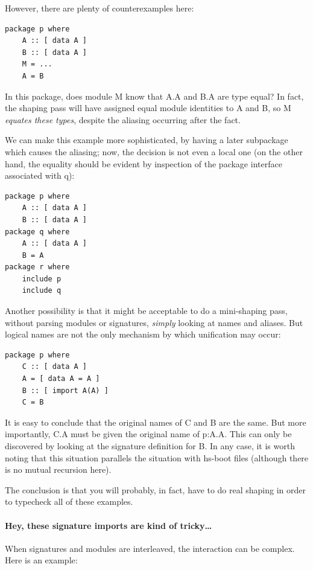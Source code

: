 \documentclass{article}
\begin{document}
However, there are plenty of counterexamples here:

\begin{verbatim}
package p where
    A :: [ data A ]
    B :: [ data A ]
    M = ...
    A = B
\end{verbatim}

In this package, does module M know that A.A and B.A are type equal?  In
fact, the shaping pass will have assigned equal module identities to A
and B, so M \emph{equates these types}, despite the aliasing occurring
after the fact.

We can make this example more sophisticated, by having a later
subpackage which causes the aliasing; now, the decision is not even a
local one (on the other hand, the equality should be evident by inspection
of the package interface associated with q):

\begin{verbatim}
package p where
    A :: [ data A ]
    B :: [ data A ]
package q where
    A :: [ data A ]
    B = A
package r where
    include p
    include q
\end{verbatim}

Another possibility is that it might be acceptable to do a mini-shaping
pass, without parsing modules or signatures, \emph{simply} looking at
names and aliases.  But logical names are not the only mechanism by
which unification may occur:

\begin{verbatim}
package p where
    C :: [ data A ]
    A = [ data A = A ]
    B :: [ import A(A) ]
    C = B
\end{verbatim}

It is easy to conclude that the original names of C and B are the same.  But
more importantly, C.A must be given the original name of p:A.A.  This can only
be discovered by looking at the signature definition for B. In any case, it
is worth noting that this situation parallels the situation with hs-boot
files (although there is no mutual recursion here).

The conclusion is that you will probably, in fact, have to do real
shaping in order to typecheck all of these examples.

\paragraph{Hey, these signature imports are kind of tricky\ldots}

When signatures and modules are interleaved, the interaction can be
complex.  Here is an example:
\end{document}
